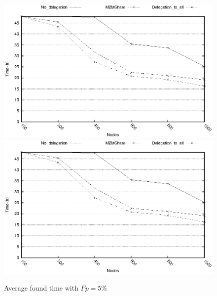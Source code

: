 
\begin{figure}[htbp]
\centering%
\subfigure%
{\includegraphics{grafici/tempiVF_Fp5.eps}}\qquad\qquad
\subfigure%
{\includegraphics{grafici/tempiVF_Fp5_zoom.eps}}
\caption{Average found time with $Fp = 5\%$\label{graficiTempiVF_Fp5}}
\end{figure}


